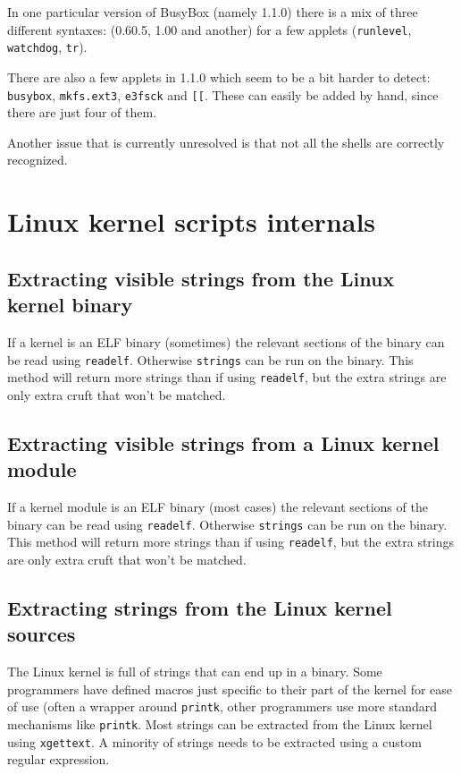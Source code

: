 \documentclass[10pt]{article}
\begin{document}
In one particular version of BusyBox (namely 1.1.0) there is a mix of three
different syntaxes: (0.60.5, 1.00 and another) for a few applets
(\texttt{runlevel}, \texttt{watchdog}, \texttt{tr}).

There are also a few applets in 1.1.0 which seem to be a bit harder to detect:
\texttt{busybox}, \texttt{mkfs.ext3}, \texttt{e3fsck} and \texttt{[[}. These
can easily be added by hand, since there are just four of them.

Another issue that is currently unresolved is that not all the shells are
correctly recognized.

\section{Linux kernel scripts internals}

\subsection{Extracting visible strings from the Linux kernel binary}

If a kernel is an ELF binary (sometimes) the relevant sections of the
binary can be read using \texttt{readelf}. Otherwise \texttt{strings} can be
run on the binary. This method will return more strings than if using
\texttt{readelf}, but the extra strings are only extra cruft that won't be
matched.

\subsection{Extracting visible strings from a Linux kernel module}

If a kernel module is an ELF binary (most cases) the relevant sections of the
binary can be read using \texttt{readelf}. Otherwise \texttt{strings} can be
run on the binary. This method will return more strings than if using
\texttt{readelf}, but the extra strings are only extra cruft that won't be
matched.

\subsection{Extracting strings from the Linux kernel sources}

The Linux kernel is full of strings that can end up in a binary. Some
programmers have defined macros just specific to their part of the kernel for
ease of use (often a wrapper around \texttt{printk}, other programmers use
more standard mechanisms like \texttt{printk}. Most strings can be extracted
from the Linux kernel using \texttt{xgettext}. A minority of strings needs to
be extracted using a custom regular expression.
\end{document}
